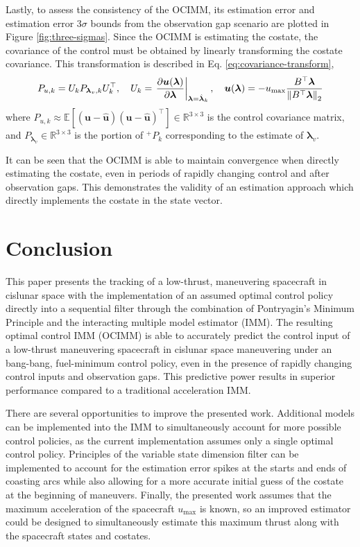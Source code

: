 \documentclass[letterpaper, preprint, paper,11pt]{AAS}	%
\newcommand{\R}{\mathbb{R}}
\newcommand{\E}{\mathbb{E}}
\begin{document}
Lastly, to assess the consistency of the OCIMM, its estimation error and estimation error $3\sigma$ bounds from the observation gap scenario are plotted in Figure \ref{fig:three-sigmas}. Since the OCIMM is estimating the costate, the covariance of the control must be obtained by linearly transforming the costate covariance. This transformation is described in Eq. \ref{eq:covariance-transform},
\begin{align}
    P_{u, k} = U_kP_{\bm{\lambda}_v, k}U_k^\top, \quad U_k = \left. \frac{\partial \bm{u}(\bm{\lambda})}{\partial{\bm{\lambda}}} \right|_{\bm{\lambda}=\hat{\bm{\lambda}}_k}, \quad \bm{u}(\bm{\lambda}) = -u_\text{max} \frac{B^\top \bm{\lambda}}{\norm{B^\top \bm{\lambda}}_2} \label{eq:covariance-transform}
\end{align}
\noindent where $P_{u,k} \approx \E[(\bm{u} - \hat{\bm{u}})(\bm{u} - \hat{\bm{u}})^\top] \in \R^{3 \times 3}$ is the control covariance matrix, and $P_{\bm{\lambda}_v} \in \R^{3 \times 3}$ is the portion of ${}^+P_k$ corresponding to the estimate of $\bm{\lambda}_v$. 

It can be seen that the OCIMM is able to maintain convergence when directly estimating the costate, even in periods of rapidly changing control and after observation gaps. This demonstrates the validity of an estimation approach which directly implements the costate in the state vector.

\section{Conclusion}

This paper presents the tracking of a low-thrust, maneuvering spacecraft in cislunar space with the implementation of an assumed optimal control policy directly into a sequential filter through the combination of Pontryagin's Minimum Principle and the interacting multiple model estimator (IMM). The resulting optimal control IMM (OCIMM) is able to accurately predict the control input of a low-thrust maneuvering spacecraft in cislunar space maneuvering under an bang-bang, fuel-minimum control policy, even in the presence of rapidly changing control inputs and observation gaps. This predictive power results in superior performance compared to a traditional acceleration IMM. 

There are several opportunities to improve the presented work. Additional models can be implemented into the IMM to simultaneously account for more possible control policies, as the current implementation assumes only a single optimal control policy. Principles of the variable state dimension filter can be implemented to account for the estimation error spikes at the starts and ends of coasting arcs while also allowing for a more accurate initial guess of the costate at the beginning of maneuvers. Finally, the presented work assumes that the maximum acceleration of the spacecraft $u_\text{max}$ is known, so an improved estimator could be designed to simultaneously estimate this maximum thrust along with the spacecraft states and costates. 

\end{document}
